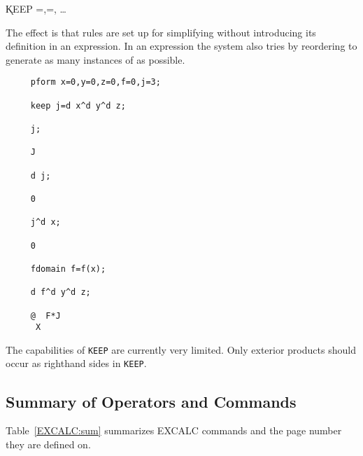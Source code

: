 \hspace*{2em} \k{KEEP}
=,=, \ldots

The effect is that rules are set up for simplifying  without
introducing its definition in an expression. In an expression the system
also tries by reordering to generate as many instances of  as
possible.

\example{}

\begin{verbatim}
     pform x=0,y=0,z=0,f=0,j=3;

     keep j=d x^d y^d z;

     j;

     J

     d j;

     0

     j^d x;

     0

     fdomain f=f(x);

     d f^d y^d z;

     @  F*J
      X
\end{verbatim}

The capabilities of {\tt KEEP} are currently very limited.  Only exterior
products should occur as righthand sides in {\tt KEEP}.


\subsection{Summary of Operators and Commands}
Table~\ref{EXCALC:sum} summarizes EXCALC commands and the page number they are
defined on.

